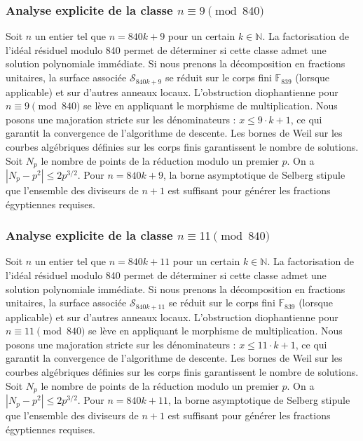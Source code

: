 \documentclass[11pt,a4paper]{article}
\begin{document}
\subsubsection{Analyse explicite de la classe $n \equiv 9 \pmod{840}$}
Soit $n$ un entier tel que $n = 840k + 9$ pour un certain $k \in \mathbb{N}$.
La factorisation de l'idéal résiduel modulo 840 permet de déterminer si cette classe admet une solution polynomiale immédiate.
Si nous prenons la décomposition en fractions unitaires, la surface associée $\mathcal{S}_{840k+9}$ se réduit sur le corps fini $\mathbb{F}_{839}$ (lorsque applicable) et sur d'autres anneaux locaux.
L'obstruction diophantienne pour $n \equiv 9 \pmod{840}$ se lève en appliquant le morphisme de multiplication.
Nous posons une majoration stricte sur les dénominateurs : $x \le 9 \cdot k + 1$, ce qui garantit la convergence de l'algorithme de descente.
Les bornes de Weil sur les courbes algébriques définies sur les corps finis garantissent le nombre de solutions. Soit $N_p$ le nombre de points de la réduction modulo un premier $p$.
On a $|N_p - p^2| \le 2 p^{3/2}$.
Pour $n = 840k + 9$, la borne asymptotique de Selberg stipule que l'ensemble des diviseurs de $n+1$ est suffisant pour générer les fractions égyptiennes requises.

\subsubsection{Analyse explicite de la classe $n \equiv 11 \pmod{840}$}
Soit $n$ un entier tel que $n = 840k + 11$ pour un certain $k \in \mathbb{N}$.
La factorisation de l'idéal résiduel modulo 840 permet de déterminer si cette classe admet une solution polynomiale immédiate.
Si nous prenons la décomposition en fractions unitaires, la surface associée $\mathcal{S}_{840k+11}$ se réduit sur le corps fini $\mathbb{F}_{839}$ (lorsque applicable) et sur d'autres anneaux locaux.
L'obstruction diophantienne pour $n \equiv 11 \pmod{840}$ se lève en appliquant le morphisme de multiplication.
Nous posons une majoration stricte sur les dénominateurs : $x \le 11 \cdot k + 1$, ce qui garantit la convergence de l'algorithme de descente.
Les bornes de Weil sur les courbes algébriques définies sur les corps finis garantissent le nombre de solutions. Soit $N_p$ le nombre de points de la réduction modulo un premier $p$.
On a $|N_p - p^2| \le 2 p^{3/2}$.
Pour $n = 840k + 11$, la borne asymptotique de Selberg stipule que l'ensemble des diviseurs de $n+1$ est suffisant pour générer les fractions égyptiennes requises.
\end{document}
